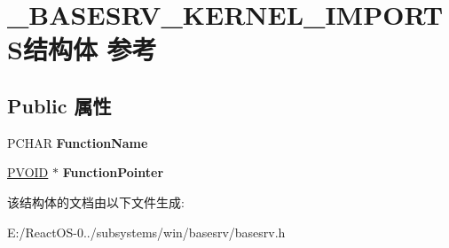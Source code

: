 \hypertarget{struct___b_a_s_e_s_r_v___k_e_r_n_e_l___i_m_p_o_r_t_s}{}\section{\+\_\+\+B\+A\+S\+E\+S\+R\+V\+\_\+\+K\+E\+R\+N\+E\+L\+\_\+\+I\+M\+P\+O\+R\+T\+S结构体 参考}
\label{struct___b_a_s_e_s_r_v___k_e_r_n_e_l___i_m_p_o_r_t_s}
\subsection*{Public 属性}
\begin{DoxyCompactItemize}
\item 
\mbox{\label{struct___b_a_s_e_s_r_v___k_e_r_n_e_l___i_m_p_o_r_t_s_af46af69f79941590482de302239ff762}} 
P\+C\+H\+AR {\bfseries Function\+Name}
\item 
\mbox{\label{struct___b_a_s_e_s_r_v___k_e_r_n_e_l___i_m_p_o_r_t_s_a36434e738dc3b6803f2cff1ab13924d8}} 
\hyperlink{interfacevoid}{P\+V\+O\+ID} $\ast$ {\bfseries Function\+Pointer}
\end{DoxyCompactItemize}


该结构体的文档由以下文件生成\+:\begin{DoxyCompactItemize}
\item 
E\+:/\+React\+O\+S-\/0../subsystems/win/basesrv/basesrv.\+h\end{DoxyCompactItemize}
